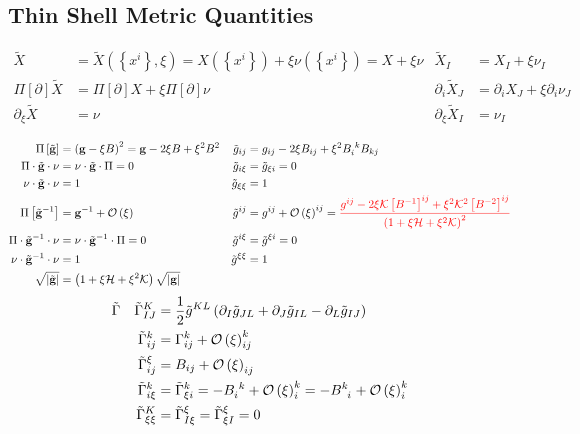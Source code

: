 \documentclass[a4paper,10pt]{scrartcl}
\newcommand{\gauss}{\mathcal{K}}
\newcommand{\mean}{\mathcal{H}}
\newcommand{\gb}{\mathbf{g}}
\newcommand{\pism}{\Pi}
\newcommand{\pis}[1]{\pism\left[ #1 \right]}
\newcommand{\landau}{\mathcal{O}}
\newcommand{\landauo}{\landau\left( \xi \right)}
\begin{document}
  \subsection{Thin Shell Metric Quantities}
  \begin{align*}
    \tilde{X} &= \tilde{X}\left(\left\{ x^{i} \right\},\xi\right) = X\left( \left\{ x^{i} \right\} \right) + \xi\nu\left( \left\{ x^{i} \right\} \right) = X + \xi\nu
        &\tilde{X}_{I} &= X_{I} + \xi\nu_{I} \\
    \pis{\partial}\tilde{X} &= \pis{\partial}X + \xi\pis{\partial}\nu
        &\partial_{i}\tilde{X}_{J} &= \partial_{i}X_{J} + \xi\partial_{i}\nu_{J}\\
    \partial_{\xi}\tilde{X} &= \nu
        &\partial_{\xi}\tilde{X}_{I} &= \nu_{I}\\
  \end{align*}
  \begin{align*}
    \pis{\tilde{\gb}} &= \left( \gb - \xi B \right)^{2} = \gb - 2\xi B + \xi^{2}B^{2}
          &\tilde{g}_{ij} &= g_{ij} - 2\xi B_{ij} + \xi^{2}\tensor{B}{_{i}^{k}}B_{kj}\\
    \pism\cdot\tilde{\gb}\cdot\nu &= \nu\cdot\tilde{\gb}\cdot\pism = 0
          &\tilde{g}_{i\xi} &= \tilde{g}_{\xi i} = 0\\
    \nu\cdot\tilde{\gb}\cdot\nu &= 1
          &\tilde{g}_{\xi\xi} &= 1\\
    \pis{\tilde{\gb}^{-1}} &= \gb^{-1} + \landauo
          &\tilde{g}^{ij} &= g^{ij} +\landauo^{ij}
                          ={\color{red} \frac{g^{ij}-2\xi\gauss\left[ B^{-1} \right]^{ij} + \xi^{2}\gauss^{2}\left[ B^{-2} \right]^{ij}}{\left( 1 + \xi\mean + \xi^{2}\gauss \right)^{2}}}\\
    \pism\cdot\tilde{\gb}^{-1}\cdot\nu &= \nu\cdot\tilde{\gb}^{-1}\cdot\pism = 0
          &\tilde{g}^{i\xi} &= \tilde{g}^{\xi i} = 0\\
    \nu\cdot\tilde{\gb}^{-1}\cdot\nu &= 1
          &\tilde{g}^{\xi\xi} &= 1\\
    \sqrt{\left| \tilde{\gb} \right|} &= \left( 1 + \xi\mean + \xi^{2}\gauss \right)\sqrt{\left| \gb \right|}
  \end{align*}
  \begin{align*}
    \tilde{\Gamma} &
          &\tilde{\Gamma}^{K}_{IJ} &= \frac{1}{2}\tilde{g}^{KL}\left( \partial_{I}\tilde{g}_{JL} + \partial_{J}\tilde{g}_{IL} - \partial_{L}\tilde{g}_{IJ} \right)\\
         &&\tilde{\Gamma}^{k}_{ij} &= \Gamma^{k}_{ij} + \landauo^{k}_{ij}\\
         &&\tilde{\Gamma}^{\xi}_{ij} &= B_{ij} + \landauo_{ij}\\
         &&\tilde{\Gamma}^{k}_{i\xi} &= \tilde{\Gamma}^{k}_{\xi i} = -\tensor{B}{_{i}^{k}} + \landauo_{i}^{k} = -\tensor{B}{^{k}_{i}} + \landauo_{i}^{k}\\
         &&\tilde{\Gamma}^{K}_{\xi\xi} &= \tilde{\Gamma}^{\xi}_{I\xi} = \tilde{\Gamma}^{\xi}_{\xi I} = 0
  \end{align*}
\end{document}
